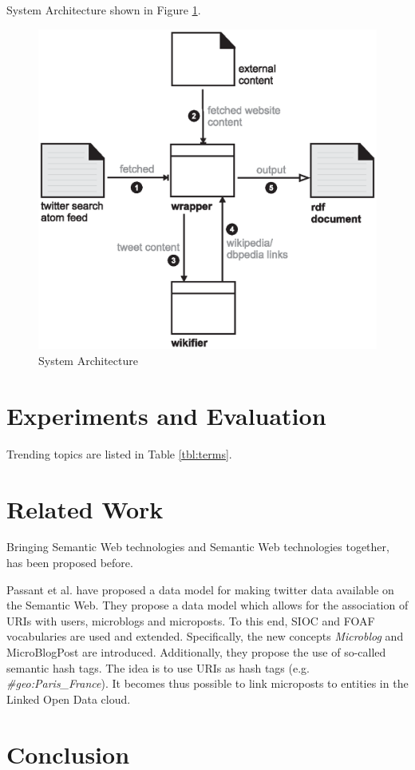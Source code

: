 \documentclass{llncs}
\begin{document}
System Architecture shown in Figure \ref{fig:arch}. 

\begin{figure}[htb]
  \centering
  \includegraphics[width=.6\linewidth]{architecture}
  \caption{System Architecture}
  \label{fig:arch}
\end{figure}

\section{Experiments and Evaluation}

Trending topics are listed in Table \ref{tbl:terms}.


\begin{definition}[Stability]

\end{definition}

\section{Related Work}

Bringing Semantic Web technologies and Semantic Web technologies together, has been proposed before.

Passant et al. \cite{key:smob} have proposed a data model for making twitter
data available on the Semantic Web. They propose a data model which allows for the association of URIs with users, microblogs and microposts. To this end, SIOC and FOAF vocabularies are used and extended. Specifically, the new concepts \emph{Microblog} and {MicroBlogPost} are introduced. Additionally, they propose the use of so-called semantic hash tags. The idea is to use URIs as hash tags (e.g. \emph{\#geo:Paris\_France}). It becomes thus possible to link microposts to entities in the Linked Open Data cloud.
\section{Conclusion}







\end{document}

